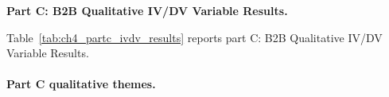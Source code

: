 
\noindent\textbf{Part C: B2B Qualitative IV/DV Variable Results.}

\noindent Table~\ref{tab:ch4_partc_ivdv_results} reports part C: B2B Qualitative IV/DV Variable Results.

\paragraph{Part C qualitative themes.}





